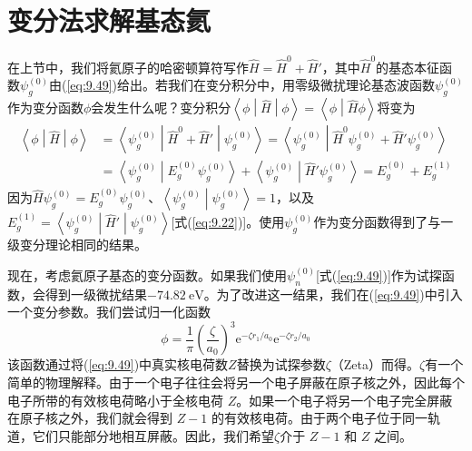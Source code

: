\section{变分法求解基态氦}
\label{sec:9.4 Variational Treatments of the Ground State of Helium}
    在上节中，我们将氦原子的哈密顿算符写作$\hat{H} = \hat{H}^0 + \hat{H}'$，其中$\hat{H}^0$的基态本征函数$\psi_g^{\left(0\right)}$由(\ref{eq:9.49})给出。若我们在变分积分中，用零级微扰理论基态波函数$\psi_g^{\left(0\right)}$作为变分函数$\phi$会发生什么呢？变分积分$\left\langle \phi \middle| \hat{H} \middle| \phi \right\rangle = \left\langle \phi \middle| \hat{H} \phi \right\rangle$将变为
    \begin{equation}
        \begin{aligned}
            \left\langle \phi \middle| \hat{H} \middle| \phi \right\rangle &= \left\langle \psi_g^{\left(0\right)} \middle| \hat{H}^0 + \hat{H}' \middle| \psi_g^{\left(0\right)} \right\rangle = \left\langle \psi_g^{\left(0\right)} \middle| \hat{H}^0\psi_g^{\left(0\right)} + \hat{H}' \psi_g^{\left(0\right)} \right\rangle \\
            &= \left\langle \psi_g^{\left(0\right)} \middle| E_g^{\left(0\right)}\psi_g^{\left(0\right)} \right\rangle + \left\langle \psi_g^{\left(0\right)} \middle| \hat{H}' \psi_g^{\left(0\right)} \right\rangle = E_g^{\left(0\right)} + E_g^{\left(1\right)}
        \end{aligned}
        \label{eq:9.55}
    \end{equation}
    因为$\hat{H}\psi_g^{\left(0\right)} = E_g^{\left(0\right)}\psi_g^{\left(0\right)}$、$\left\langle \psi_g^{\left(0\right)} \middle| \psi_g^{\left(0\right)} \right\rangle = 1$，以及$E_g^{\left(1\right)} = \left\langle \psi_g^{\left(0\right)} \middle| \hat{H}' \middle| \psi_g^{\left(0\right)} \right\rangle$[式(\ref{eq:9.22})]。使用$\psi_g^{\left(0\right)}$作为变分函数得到了与一级变分理论相同的结果。

    现在，考虑氦原子基态的变分函数。如果我们使用$\psi_n^{\left(0\right)}$[式(\ref{eq:9.49})]作为试探函数，会得到一级微扰结果$-74.82 \: \mathrm{eV}$。为了改进这一结果，我们在(\ref{eq:9.49})中引入一个变分参数。我们尝试归一化函数
    \begin{equation}
        \phi = \frac{1}{\pi} \left(\frac{\zeta}{a_0}\right)^3 \mathrm{e}^{-\zeta r_1/a_0} \mathrm{e}^{-\zeta r_2/a_0}
        \label{eq:9.56}
    \end{equation}
    该函数通过将(\ref{eq:9.49})中真实核电荷数$Z$替换为试探参数$\zeta$（Zeta）而得。$\zeta$有一个简单的物理解释。由于一个电子往往会将另一个电子屏蔽在原子核之外，因此每个电子所带的有效核电荷略小于全核电荷 $Z$。如果一个电子将另一个电子完全屏蔽在原子核之外，我们就会得到 $Z-1$ 的有效核电荷。由于两个电子位于同一轨道，它们只能部分地相互屏蔽。因此，我们希望$\zeta$介于 $Z-1$ 和 $Z$ 之间。

